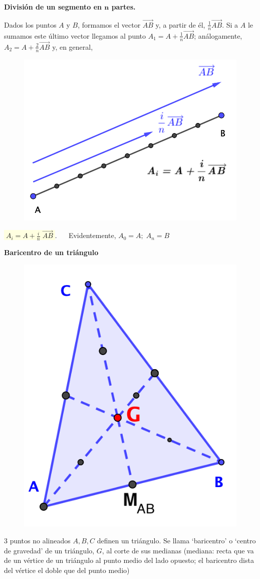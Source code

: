 \vspace{5mm} \textbf{División de un segmento en $\boldsymbol{ n }$ partes.}

\begin{multicols}{2}

Dados los puntos $A$ y $B$, formamos el vector $\overrightarrow{AB}$ y, a partir de él, $\frac 1 n \overrightarrow{AB}$. Si a $A$ le sumamos este último vector llegamos al punto $A_1=A+\frac 1 n \overrightarrow{AB}$; análogamente, $A_2=A+\frac 2 n \overrightarrow{AB}$ y, en general, 
\begin{figure}[H]
	\centering
	\includegraphics[width=.45\textwidth]{imagenes/imagenes09/T09IM11.png}
\end{figure}

\end{multicols}
\colorbox{LightYellow}{$\boxed{\;A_i=A+\frac i n\;  \overrightarrow{AB}\;}$}. $\quad$ Evidentemente, $A_0=A; \; A_n=B$

\newpage %
\textbf{Baricentro de un triángulo}

\begin{multicols}{2}
\begin{figure}[H]
	\centering
	\includegraphics[width=.35\textwidth]{imagenes/imagenes09/T09IM13.png}
\end{figure}

$3$ puntos no alineados $A,B, C$ definen un triángulo. Se llama `baricentro' o `centro de gravedad' de un triángulo, $G$,  al corte de sus medianas \textcolor{gris}{(mediana: recta que va de un vértice de un triángulo al punto medio del lado opuesto; el baricentro dista del vértice el doble que del punto medio)} 

\end{multicols}

